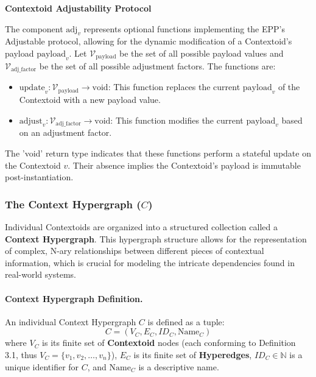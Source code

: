 \textbf{Contextoid Adjustability Protocol }

The component \( \text{adj}_v \) represents optional functions implementing the EPP's Adjustable protocol, allowing for the dynamic modification of a Contextoid's payload \( \text{payload}_v \).
Let \(\mathcal{V}_{\text{payload}}\) be the set of all possible payload values and \(\mathcal{V}_{\text{adj\_factor}}\) be the set of all possible adjustment factors. The functions are:
\begin{itemize}
    \item \( \text{update}_v: \mathcal{V}_{\text{payload}} \to \text{void} \): This function replaces the current \( \text{payload}_v \) of the Contextoid with a new payload value.
    \item \( \text{adjust}_v: \mathcal{V}_{\text{adj\_factor}} \to \text{void} \): This function modifies the current \( \text{payload}_v \) based on an adjustment factor.
\end{itemize}
The 'void' return type indicates that these functions perform a stateful update on the Contextoid \(v\). Their absence implies the Contextoid's payload is immutable post-instantiation.

\newpage

\subsubsection[The Context Hypergraph (C)]{The Context Hypergraph (\(C\))}
\label{ssec:context_hypergraph_formal}

Individual Contextoids are organized into a structured collection called a \textbf{Context Hypergraph}. This hypergraph structure allows for the representation of complex, N-ary relationships between different pieces of contextual information, which is crucial for modeling the intricate dependencies found in real-world systems.

\paragraph*{Context Hypergraph Definition.}
An individual Context Hypergraph \( C \) is defined as a tuple:
\[ C = (V_C, E_C, ID_C, \text{Name}_C) \]
where \(V_C\) is its finite set of \textbf{Contextoid} nodes (each conforming to Definition 3.1, thus \( V_C = \{v_1, v_2, \dots, v_n\} \)), \(E_C\) is its finite set of \textbf{Hyperedges}, \(ID_C \in \mathbb{N}\) is a unique identifier for \(C\), and \(\text{Name}_C\) is a descriptive name.

